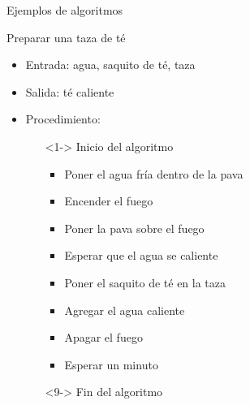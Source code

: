 \documentclass[xcolor=pdftex,table,11pt]{beamer}
\begin{document}
\begin{frame}{Ejemplos de algoritmos}

\begin{block}{Preparar una taza de té}
   \begin{itemize}
   \item Entrada: agua, saquito de té, taza
   \item Salida: té caliente
   \item Procedimiento: 
   \begin{itemize}
   \item[]<1-> Inicio del algoritmo

   \begin{itemize}
   
     	\item<1-> Poner el agua fría dentro de la pava
     	 \item<2-> Encender el fuego 
     	 \item<3-> Poner la pava sobre el fuego
   		\item<4-> Esperar que el agua se caliente
   		\item<5-> Poner el saquito de té en la taza
 		\item<6-> Agregar el agua caliente
 		\item<7-> Apagar el fuego
 		\item<8-> Esperar un minuto
 		
   \end{itemize}
 \item[]<9-> Fin del algoritmo

	\end{itemize}
\end{itemize}

\end{block}


\end{frame}
\end{document}
